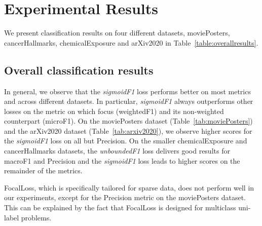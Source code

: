 
\section{Experimental Results}
\label{sec:orgc23a664}

We present classification results on four different datasets, movie\-Posters, cancerHallmarks, chemicalExposure and arXiv2020 in Table~\ref{table:overallresults}.

\subsection{Overall classification results}

In general, we observe that the \emph{sigmoidF1} loss performs better on most metrics and across different datasets. In particular, \emph{sigmoidF1} always outperforms other losses on the metric on which focus (weightedF1) and its non-weighted counterpart (microF1).
On the moviePosters dataset (Table~\ref{tab:moviePosters}) and the arXiv2020 dataset (Table~\ref{tab:arxiv2020}), we observe higher scores for the \emph{sigmoidF1} loss on all but Precision.
On the smaller chemicalExposure and cancerHallmarks datasets, the \emph{unboundedF1} loss delivers good results for macroF1 and Precision and the \emph{sigmoidF1} loss leads to higher scores on the remainder of the metrics.



FocalLoss, which is specifically tailored for sparse data, does not perform well in our experiments, except for the Precision metric on the moviePosters dataset. This can be explained by the fact that FocalLoss is designed for multiclass uni-label problems.

